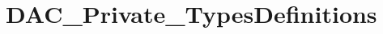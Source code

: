 \hypertarget{group___d_a_c___private___types_definitions}{\section{D\-A\-C\-\_\-\-Private\-\_\-\-Types\-Definitions}
\label{group___d_a_c___private___types_definitions}
}
